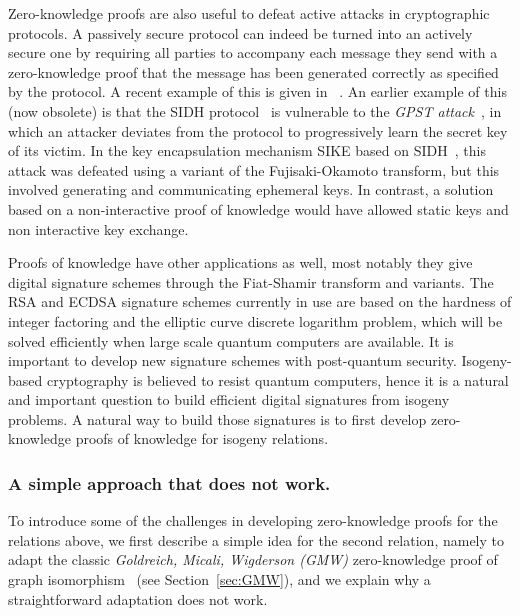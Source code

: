 \documentclass{llncs}
\begin{document}
Zero-knowledge proofs are also useful to defeat active attacks in cryptographic protocols. A passively secure protocol can indeed be turned into an actively secure one by requiring all parties to accompany each message they send with a zero-knowledge proof that the message has been generated correctly as specified by the protocol.
%
A recent example of this is given in ~\cite{cryptoeprint:2022/1469}.
An earlier example of this (now obsolete) is that the SIDH protocol~\cite{DFJP14} is vulnerable to the \emph{GPST attack}~\cite{GPST16}, in which an attacker deviates from the protocol to progressively learn the secret key of its victim. 
In the key encapsulation mechanism SIKE based on SIDH~\cite{sike2017}, this attack was defeated using a variant of the Fujisaki-Okamoto transform, but this involved generating and communicating ephemeral keys. In contrast, a solution based on a non-interactive proof of knowledge would have allowed static keys and non interactive key exchange.



Proofs of knowledge have other applications as well, most notably they give digital signature schemes through the Fiat-Shamir transform and variants. 
%
The RSA and ECDSA signature schemes currently in use are based on the hardness of integer factoring and the elliptic curve discrete logarithm problem, which will be solved efficiently when large scale quantum computers are available.
It is important to develop new signature schemes with post-quantum security.
%
Isogeny-based cryptography is believed to resist quantum computers, hence it is a natural and important question to build efficient digital signatures from isogeny problems. A natural way to build those signatures is to first develop zero-knowledge proofs of knowledge for isogeny relations.









\subsubsection{A simple approach that does not work.}\label{sec:simple}


               
To introduce some of the challenges in developing zero-knowledge proofs for the relations above, we first describe a simple idea for the second relation, namely to adapt the classic \emph{Goldreich, Micali, Wigderson (GMW)} zero-knowledge proof of graph isomorphism~\cite{GMW} (see Section~\ref{sec:GMW}), and we explain why a straightforward adaptation does not work. 
\end{document}
